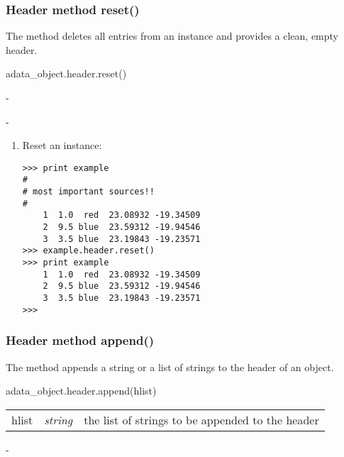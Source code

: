 \subsubsection{Header method reset()}
\label{ahe_res}
%
The method deletes all entries from an \ah instance and provides
a clean, empty header.

adata\_object.header.reset()

-

-

\begin{enumerate}
\item Reset an \ah instance:
\begin{small}
\begin{verbatim}
>>> print example
#
# most important sources!!
#
    1  1.0  red  23.08932 -19.34509
    2  9.5 blue  23.59312 -19.94546
    3  3.5 blue  23.19843 -19.23571
>>> example.header.reset()
>>> print example
    1  1.0  red  23.08932 -19.34509
    2  9.5 blue  23.59312 -19.94546
    3  3.5 blue  23.19843 -19.23571
>>>
\end{verbatim}
\end{small}
\end{enumerate}

\subsubsection{Header method append()}
\label{ahe_append}
The method appends a string or a list of strings to the header
of an \ad object.

adata\_object.header.append(hlist)

\begin{tabular}{lcl}
hlist &{\it string}& the list of strings to be appended to the header\\
\end{tabular}

-


